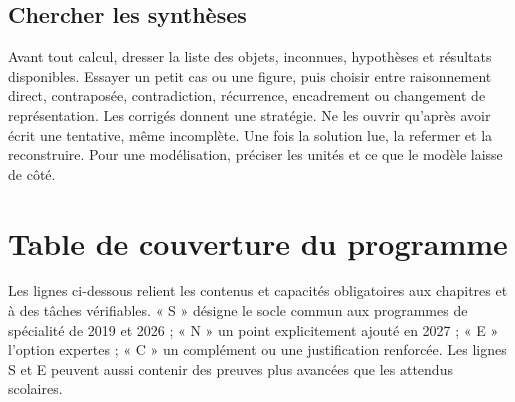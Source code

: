 \section{Chercher les synthèses}
Avant tout calcul, dresser la liste des objets, inconnues, hypothèses et résultats disponibles. Essayer un petit cas ou une figure, puis choisir entre raisonnement direct, contraposée, contradiction, récurrence, encadrement ou changement de représentation.
Les corrigés donnent une stratégie. Ne les ouvrir qu'après avoir écrit une tentative, même incomplète. Une fois la solution lue, la refermer et la reconstruire. Pour une modélisation, préciser les unités et ce que le modèle laisse de côté.
\chapter{Table de couverture du programme}
Les lignes ci-dessous relient les contenus et capacités obligatoires aux chapitres et à des tâches vérifiables. « S » désigne le socle commun aux programmes de spécialité de 2019 et 2026 ; « N » un point explicitement ajouté en 2027 ; « E » l'option expertes ; « C » un complément ou une justification renforcée. Les lignes S et E peuvent aussi contenir des preuves plus avancées que les attendus scolaires.
